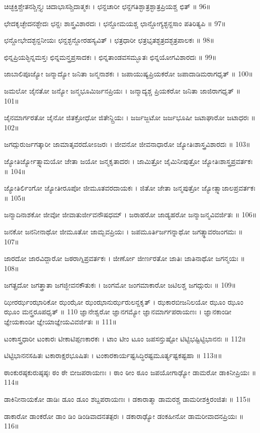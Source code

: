 ಚಿಚ್ಛಕ್ತಿಶ್ಚೇತನಶ್ಚಿನ್ತ್ಯಃ ಚಿದಾಭಾಸಶ್ಚಿದಾತ್ಮಕಃ ।
ಛನ್ದಚಾರೀ ಛನ್ದಗತಿಶ್ಛಾತ್ರಶ್ಛಾತ್ರಪ್ರಿಯಶ್ಚ ಛಿತ್ ॥ 96॥

ಛೇದಕೃಚ್ಛೇದನಶ್ಛೇದಃ ಛನ್ದಃ ಶಾಸ್ತ್ರವಿಶಾರದಃ ।
ಛನ್ದೋಮಯಶ್ಚ ಛಾನ್ದೋಗ್ಯಶ್ಛನ್ದಸಾಂ ಪತಿರಿತ್ಯಪಿ ॥ 97॥

ಛನ್ದೋಭೇದಶ್ಛನ್ದನೀಯಃ ಛನ್ದಶ್ಛನ್ದೋರಹಸ್ಯವಿತ್ ।
ಛತ್ರಧಾರೀ ಛತ್ರಭೃತಶ್ಛತ್ರದಶ್ಛತ್ರಪಾಲಕಃ ॥ 98॥

ಛಿನ್ನಪ್ರಿಯಶ್ಛಿನ್ನಮಸ್ತಃ ಛಿನ್ನಮನ್ತ್ರಪ್ರಸಾದಕಃ ।
ಛಿನ್ನತಾಂಡವಸಮ್ಭೂತಃ ಛಿನ್ನಯೋಗವಿಶಾರದಃ ॥ 99॥

ಜಾಬಾಲಿಪೂಜ್ಯೋ ಜನ್ಮಾದ್ಯೋ ಜನಿತಾ ಜನ್ಮನಾಶಕಃ ।
ಜಪಾಯುಷ್ಯಪ್ರಿಯಕರೋ ಜಪಾದಾಡಿಮರಾಗಧೃತ್ ॥ 100॥

ಜಮಲೋ ಜೈನತೋ ಜನ್ಯೋ ಜನ್ಮಭೂಮಿರ್ಜನಪ್ರಿಯಃ ।
ಜನ್ಮಾದ್ಯಶ್ಚ ಪ್ರಿಯಕರೋ ಜನಿತಾ ಜಾಜಿರಾಗಧೃತ್ ॥ 101॥

ಜೈನಮಾರ್ಗರತೋ ಜೈನೋ ಜಿತಕ್ರೋಧೋ ಜಿತೇನ್ದ್ರಿಯಃ ।
ಜರ್ಜಜ್ಜಟೋ ಜರ್ಜಭೂಷೀ ಜಟಾಘಾರೋ ಜಟಾಧರಃ ॥ 102॥

ಜಗದ್ಗುರುರ್ಜಗತ್ಕಾರೀ ಜಾಮಾತೃವರದೋಽಜರಃ ।
ಜೀವನೋ ಜೀವನಾಧಾರೋ ಜ್ಯೋತಿಃಶಾಸ್ತ್ರವಿಶಾರದಃ ॥ 103॥

ಜ್ಯೋತಿರ್ಜ್ಯೋತ್ಸ್ನಾಮಯೋ ಜೇತಾ ಜಯೋ ಜನ್ಮಕೃತಾದರಃ ।
ಜಾಮಿತ್ರೋ ಜೈಮಿನೀಪುತ್ರೋ ಜ್ಯೋತಿಃಶಾಸ್ತ್ರಪ್ರವರ್ತಕಃ ॥ 104॥

ಜ್ಯೋತಿರ್ಲಿಂಗೋ ಜ್ಯೋತೀರೂಪೋ ಜೀಮೂತವರದಾಯಕಃ ।
ಜಿತೋ ಜೇತಾ ಜನ್ಮಪುತ್ರೋ ಜ್ಯೋತ್ಸ್ನಾಜಾಲಪ್ರವರ್ತಕಃ ॥ 105॥

ಜನ್ಮಾದಿನಾಶಕೋ ಜೀವೋ ಜೀವಾತುರ್ಜೀವನೌಷಧಮ್ ।
ಜರಾಹರೋ ಜಾಡ್ಯಹರೋ ಜನ್ಮಾಜನ್ಮವಿವರ್ಜಿತಃ ॥ 106॥

ಜನಕೋ ಜನನೀನಾಥೋ ಜೀಮೂತೋ ಜಾಮ್ಬವಪ್ರಿಯಃ ।
ಜಪಮೂರ್ತಿರ್ಜಗನ್ನಾಥೋ ಜಗತ್ಸ್ಥಾವರಜಂಗಮಃ ॥ 107॥

ಜಾರದೋ ಜಾರವಿದ್ಜಾರೋ ಜಠರಾಗ್ನಿಪ್ರವರ್ತಕಃ ।
ಜೀರ್ಣೋ ಜೀರ್ಣರತೋ ಜಾತಿಃ ಜಾತಿನಾಥೋ ಜಗನ್ಮಯಃ ॥ 108॥

ಜಗತ್ಪ್ರದೋ ಜಗತ್ತ್ರಾತಾ ಜಗಜ್ಜೀವನಕೌತುಕಃ ।
ಜಂಗಮೋ ಜಂಗಮಾಕಾರೋ ಜಟಿಲಶ್ಚ ಜಗದ್ಗುರುಃ ॥ 109॥

ಝೀರರ್ಝಂಝಾರಿಕೋ ಝಂಝೋ ಝಂಝಾನುರ್ಝರುಲನ್ದಕೃತ್ ।
ಝಕಾರಬೀಜನಿಲಯೋ ಝೂಂ ಝೂಂ ಝೂಂ ಮನ್ತ್ರರೂಪಧೃತ್ ॥ 110
ಜ್ಞಾನೇಶ್ವರೋ ಜ್ಞಾನಗಮ್ಯೋ ಜ್ಞಾನಮಾರ್ಗಪರಾಯಣಃ ।
ಜ್ಞಾನಕಾಂಡೀ ಜ್ಞೇಯಕಾಂಡೀ ಜ್ಞೇಯಾಜ್ಞೇಯವಿವರ್ಜಿತಃ ॥ 111॥

ಟಂಕಾಸ್ತ್ರಧಾರೀ ಟಂಕಾರಃ ಟೀಕಾಟಿಪ್ಪಣಕಾರಕಃ ।
ಟಾಂ ಟೀಂ ಟೂಂ ಜಪಸನ್ತುಷ್ಟೋ ಟಿಟ್ಟಿಭಷ್ಟಿಟ್ಟಿಭಾನನಃ ॥ 112॥

ಟಿಟ್ಟಿಭಾನನಸಹಿತಃ ಟಕಾರಾಕ್ಷರಭೂಷಿತಃ ।
ಟಂಕಾರಕಾರ್ಯಷ್ಟಸಿದ್ಧಿರಷ್ಟಮೂರ್ತ್ಯಷ್ಟಕಷ್ಟಹಾ ॥ 113॥॥

ಠಾಂಕುರಷ್ಠಕುರುಷ್ಠಷ್ಠಃ ಠಂ ಠೇ ಬೀಜಪರಾಯಣಃ ।
ಠಾಂ ಠೀಂ ಠೂಂ ಜಪಯೋಗಾಢ್ಯೋ ಡಾಮರೋ ಡಾಕಿನೀಪ್ರಿಯಃ ॥ 114॥

ಡಾಕಿನೀನಾಯಕೋ ಡಾಡಿಃ ಡೂಂ ಡೂಂ ಶಬ್ದಪರಾಯಣಃ ।
ಡಕಾರಾತ್ಮಾ ಡಾಮರಶ್ಚ ಡಾಮರೀಶಕ್ತಿರಂಜಿತಃ ॥ 115॥

ಡಾಕಾರೋ ಡಾಂಕರೋ ಡಾಂ ಡಿಂ ಡಿಂಡಿವಾದನತತ್ಪರಃ ।
ಡಕಾರಾಢ್ಯೋ ಡಂಕಹೀನೋ ಡಾಮರೀವಾದನಪ್ರಿಯಃ ॥ 116॥

